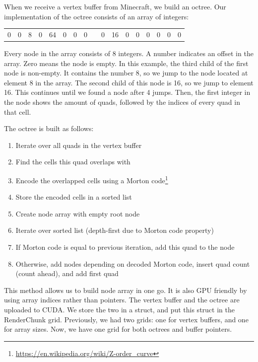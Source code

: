 \documentclass[]{article}
\begin{document}
When we receive a vertex buffer from Minecraft, we build an octree.
Our implementation of the octree consists of an array of integers:

\begin{center}
  \begin{tabular}{|l|l|l|l|l|l|l|l|c|l|l|l|l|l|l|l|l|} \cline{1-8} \cline{10-17}
    0 & 0 & 8 & 0 & 64 & 0 & 0 & 0 & & 0 & 16 & 0 & 0 & 0 & 0 & 0 & 0 \\ \cline{1-8} \cline{10-17}
  \end{tabular}
\end{center}

Every node in the array consists of 8 integers.
A number indicates an offset in the array.
Zero means the node is empty.
In this example, the third child of the first node is non-empty.
It contains the number 8, so we jump to the node located at element 8 in the array.
The second child of this node is 16, so we jump to element 16.
This continues until we found a node after 4 jumps.
Then, the first integer in the node shows the amount of quads, followed by the indices of every quad in that cell.

The octree is built as follows:
\begin{enumerate}
  \item Iterate over all quads in the vertex buffer
  \item Find the cells this quad overlaps with
  \item Encode the overlapped cells using a Morton code\footnote{\url{https://en.wikipedia.org/wiki/Z-order_curve}}
  \item Store the encoded cells in a sorted list
  \item Create node array with empty root node
  \item Iterate over sorted list (depth-first due to Morton code property)
  \item If Morton code is equal to previous iteration, add this quad to the node
  \item Otherwise, add nodes depending on decoded Morton code, insert quad count (count ahead), and add first quad
\end{enumerate}
This method allows us to build node array in one go.
It is also GPU friendly by using array indices rather than pointers.
The vertex buffer and the octree are uploaded to CUDA.
We store the two in a struct, and put this struct in the RenderChunk grid.
Previously, we had two grids: one for vertex buffers, and one for array sizes.
Now, we have one grid for both octrees and buffer pointers.
\end{document}
